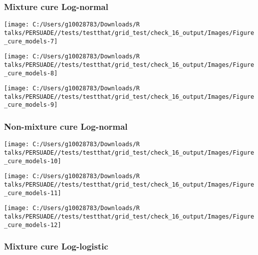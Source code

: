 \documentclass[
]{article}
\begin{document}
\subsubsection{Mixture cure Log-normal}\label{mixture-cure-log-normal}

\begin{flushleft}\texttt{[image: C:/Users/g10028783/Downloads/R talks/PERSUADE//tests/testthat/grid\_test/check\_16\_output/Images/Figure\_cure\_models-7]} \end{flushleft}

\begin{flushleft}\texttt{[image: C:/Users/g10028783/Downloads/R talks/PERSUADE//tests/testthat/grid\_test/check\_16\_output/Images/Figure\_cure\_models-8]} \end{flushleft}

\begin{flushleft}\texttt{[image: C:/Users/g10028783/Downloads/R talks/PERSUADE//tests/testthat/grid\_test/check\_16\_output/Images/Figure\_cure\_models-9]} \end{flushleft}

\clearpage

\subsubsection{Non-mixture cure
Log-normal}\label{non-mixture-cure-log-normal}

\begin{flushleft}\texttt{[image: C:/Users/g10028783/Downloads/R talks/PERSUADE//tests/testthat/grid\_test/check\_16\_output/Images/Figure\_cure\_models-10]} \end{flushleft}

\begin{flushleft}\texttt{[image: C:/Users/g10028783/Downloads/R talks/PERSUADE//tests/testthat/grid\_test/check\_16\_output/Images/Figure\_cure\_models-11]} \end{flushleft}

\begin{flushleft}\texttt{[image: C:/Users/g10028783/Downloads/R talks/PERSUADE//tests/testthat/grid\_test/check\_16\_output/Images/Figure\_cure\_models-12]} \end{flushleft}

\clearpage

\subsubsection{Mixture cure
Log-logistic}\label{mixture-cure-log-logistic}
\end{document}
